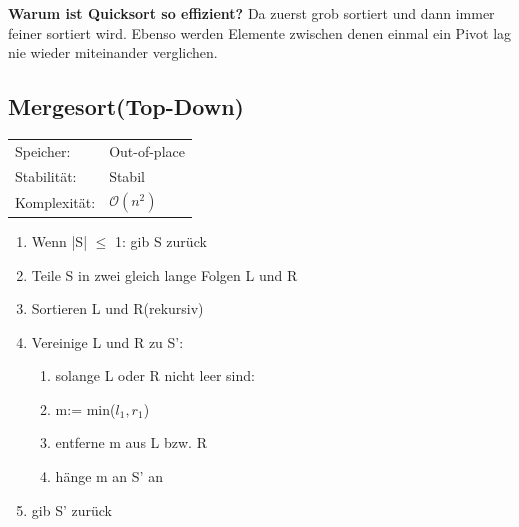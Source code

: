 \documentclass[12pt,a4paper]{article}
\begin{document}
\vspace*{0.7cm}
\newline
\textbf{Warum ist Quicksort so effizient?}\newline
Da zuerst grob sortiert und dann immer feiner sortiert wird. Ebenso werden Elemente zwischen denen einmal ein Pivot lag nie wieder miteinander verglichen. 


\subsection{Mergesort(Top-Down)}
\begin{tabularx}{\textwidth}{l l}
	Speicher: &Out-of-place\\
	Stabilität: &Stabil\\
	Komplexität: &$\mathcal{O}(n^2)$\\
\end{tabularx}
\vspace{.8cm}
\newline
\begin{minipage}[c]{0.7\textwidth}
	\begin{enumerate}
		\item Wenn |S| $\leq $ 1: gib S zurück
		\item Teile S in zwei gleich lange Folgen L und R
		\item Sortieren L und R(rekursiv)
		\item Vereinige L und R zu S':
		\begin{enumerate}
			\item solange L oder R nicht leer sind:
			\item m:= min($l_1,r_1$)
			\item entferne m aus L bzw. R
			\item hänge m an S' an
		\end{enumerate}
		\item gib S' zurück
	\end{enumerate}
\end{minipage}
\end{document}
